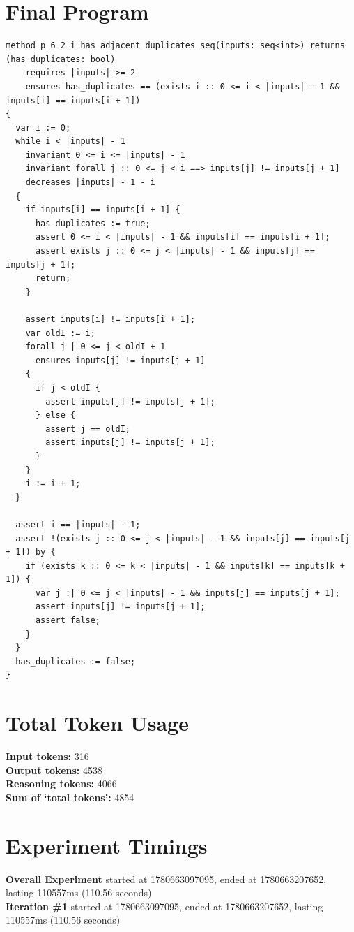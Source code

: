 \documentclass{article}
\begin{document}
\section*{Final Program}
\begin{lstlisting}
method p_6_2_i_has_adjacent_duplicates_seq(inputs: seq<int>) returns (has_duplicates: bool)
	requires |inputs| >= 2
	ensures has_duplicates == (exists i :: 0 <= i < |inputs| - 1 && inputs[i] == inputs[i + 1])
{
  var i := 0;
  while i < |inputs| - 1
    invariant 0 <= i <= |inputs| - 1
    invariant forall j :: 0 <= j < i ==> inputs[j] != inputs[j + 1]
    decreases |inputs| - 1 - i
  {
    if inputs[i] == inputs[i + 1] {
      has_duplicates := true;
      assert 0 <= i < |inputs| - 1 && inputs[i] == inputs[i + 1];
      assert exists j :: 0 <= j < |inputs| - 1 && inputs[j] == inputs[j + 1];
      return;
    }

    assert inputs[i] != inputs[i + 1];
    var oldI := i;
    forall j | 0 <= j < oldI + 1
      ensures inputs[j] != inputs[j + 1]
    {
      if j < oldI {
        assert inputs[j] != inputs[j + 1];
      } else {
        assert j == oldI;
        assert inputs[j] != inputs[j + 1];
      }
    }
    i := i + 1;
  }

  assert i == |inputs| - 1;
  assert !(exists j :: 0 <= j < |inputs| - 1 && inputs[j] == inputs[j + 1]) by {
    if (exists k :: 0 <= k < |inputs| - 1 && inputs[k] == inputs[k + 1]) {
      var j :| 0 <= j < |inputs| - 1 && inputs[j] == inputs[j + 1];
      assert inputs[j] != inputs[j + 1];
      assert false;
    }
  }
  has_duplicates := false;
}
\end{lstlisting}
\section*{Total Token Usage}
\textbf{Input tokens: }316
\\\textbf{Output tokens: }4538
\\\textbf{Reasoning tokens: }4066
\\\textbf{Sum of `total tokens': }4854
\section*{Experiment Timings}
\textbf{Overall Experiment} started at 1780663097095, ended at 1780663207652, lasting 110557ms (110.56 seconds)
\\\textbf{Iteration \#1} started at 1780663097095, ended at 1780663207652, lasting 110557ms (110.56 seconds)
\end{document}

